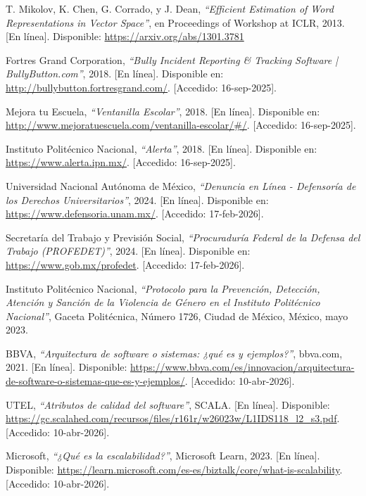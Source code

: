 

T. Mikolov, K. Chen, G. Corrado, y J. Dean, \textit{``Efficient Estimation of Word Representations in Vector Space''}, en Proceedings of Workshop at ICLR, 2013. [En línea]. Disponible: \url{https://arxiv.org/abs/1301.3781}

Fortres Grand Corporation, \textit{``Bully Incident Reporting \& Tracking Software | BullyButton.com''}, 2018. [En línea]. Disponible en: \url{http://bullybutton.fortresgrand.com/}. [Accedido: 16-sep-2025].

Mejora tu Escuela, \textit{``Ventanilla Escolar''}, 2018. [En línea]. Disponible en: \url{http://www.mejoratuescuela.com/ventanilla-escolar/\#/}. [Accedido: 16-sep-2025].

Instituto Politécnico Nacional, \textit{``Alerta''}, 2018. [En línea]. Disponible en: \url{https://www.alerta.ipn.mx/}. [Accedido: 16-sep-2025].

Universidad Nacional Autónoma de México, \textit{``Denuncia en Línea - Defensoría de los Derechos Universitarios''}, 2024. [En línea]. Disponible en: \url{https://www.defensoria.unam.mx/}. [Accedido: 17-feb-2026].

Secretaría del Trabajo y Previsión Social, \textit{``Procuraduría Federal de la Defensa del Trabajo (PROFEDET)''}, 2024. [En línea]. Disponible en: \url{https://www.gob.mx/profedet}. [Accedido: 17-feb-2026].

Instituto Politécnico Nacional, \textit{``Protocolo para la Prevención, Detección, Atención y Sanción de la Violencia de Género en el Instituto Politécnico Nacional''}, Gaceta Politécnica, Número 1726, Ciudad de México, México, mayo 2023.

BBVA, \textit{``Arquitectura de software o sistemas: ¿qué es y ejemplos?''}, bbva.com, 2021. [En línea]. Disponible: \url{https://www.bbva.com/es/innovacion/arquitectura-de-software-o-sistemas-que-es-y-ejemplos/}. [Accedido: 10-abr-2026].

UTEL, \textit{``Atributos de calidad del software''}, SCALA. [En línea]. Disponible: \url{https://gc.scalahed.com/recursos/files/r161r/w26023w/L1IDS118_l2_s3.pdf}. [Accedido: 10-abr-2026].

Microsoft, \textit{``¿Qué es la escalabilidad?''}, Microsoft Learn, 2023. [En línea]. Disponible: \url{https://learn.microsoft.com/es-es/biztalk/core/what-is-scalability}. [Accedido: 10-abr-2026].


